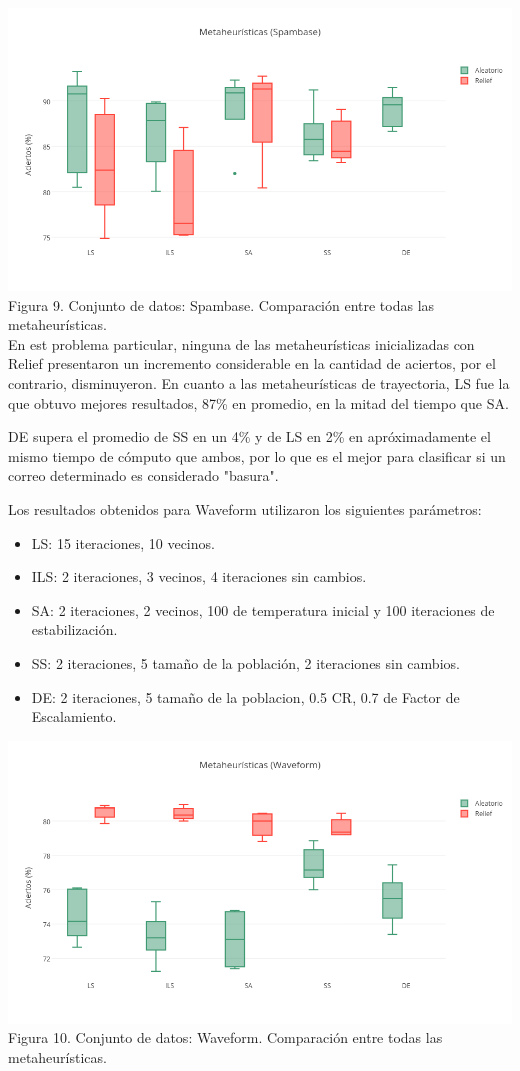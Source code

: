 \documentclass{ci5652}
\begin{document}
\includegraphics[width=\columnwidth]{metaheuristicas_Spambase}
{\small Figura 9. Conjunto de datos: Spambase. Comparación entre todas las metaheurísticas.}\\

En est problema particular, ninguna de las metaheurísticas inicializadas con Relief presentaron un incremento considerable en la cantidad de aciertos, por el contrario, disminuyeron. En cuanto a las metaheurísticas de trayectoria, LS fue la que obtuvo mejores resultados, 87\% en promedio, en la mitad del tiempo que SA.

DE supera el promedio de SS en un 4\% y de LS en 2\% en apróximadamente el mismo tiempo de cómputo que ambos, por lo que es el mejor para clasificar si un correo determinado es considerado "basura".

Los resultados obtenidos para Waveform utilizaron los siguientes parámetros:
\begin{itemize}
  \item LS: 15 iteraciones, 10 vecinos.
  \item ILS: 2 iteraciones, 3 vecinos, 4 iteraciones sin cambios.
  \item SA: 2 iteraciones, 2 vecinos, 100 de temperatura inicial y 100 iteraciones de estabilización.
  \item SS: 2 iteraciones, 5 tamaño de la población, 2 iteraciones sin cambios.
  \item DE: 2 iteraciones, 5 tamaño de la poblacion, 0.5 CR, 0.7 de Factor de Escalamiento.
\end{itemize}

\includegraphics[width=\columnwidth]{metaheuristicas_Waveform}
{\small Figura 10. Conjunto de datos: Waveform. Comparación entre todas las metaheurísticas.}\\
\end{document}
